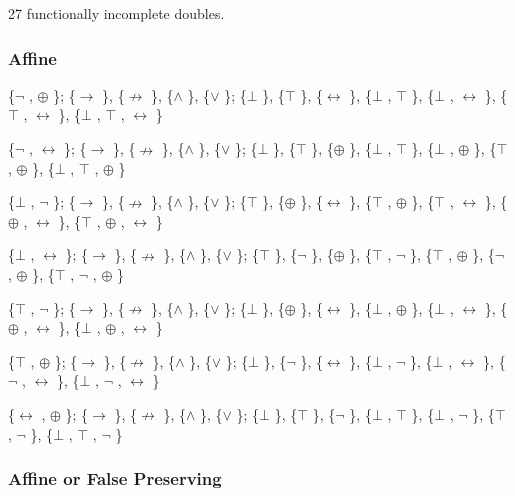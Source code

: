 27 functionally incomplete doubles.

\hypertarget{affine}{%
\subsubsection{Affine}\label{affine}}

\{$\neg$ , $\oplus$ \}; \{$\to$ \}, \{$\nrightarrow$ \}, \{$\land$ \}, \{$\lor$ \}; \{$\bot$ \}, \{$\top$ \}, \{$\leftrightarrow$ \}, \{$\bot$ , $\top$ \},
\{$\bot$ , $\leftrightarrow$ \}, \{$\top$ , $\leftrightarrow$ \}, \{$\bot$ , $\top$ , $\leftrightarrow$ \}

\{$\neg$ , $\leftrightarrow$ \}; \{$\to$ \}, \{$\nrightarrow$ \}, \{$\land$ \}, \{$\lor$ \}; \{$\bot$ \}, \{$\top$ \}, \{$\oplus$ \}, \{$\bot$ , $\top$ \},
\{$\bot$ , $\oplus$ \}, \{$\top$ , $\oplus$ \}, \{$\bot$ , $\top$ , $\oplus$ \}

\{$\bot$ , $\neg$ \}; \{$\to$ \}, \{$\nrightarrow$ \}, \{$\land$ \}, \{$\lor$ \}; \{$\top$ \}, \{$\oplus$ \}, \{$\leftrightarrow$ \}, \{$\top$ , $\oplus$ \},
\{$\top$ , $\leftrightarrow$ \}, \{$\oplus$ , $\leftrightarrow$ \}, \{$\top$ , $\oplus$ , $\leftrightarrow$ \}

\{$\bot$ , $\leftrightarrow$ \}; \{$\to$ \}, \{$\nrightarrow$ \}, \{$\land$ \}, \{$\lor$ \}; \{$\top$ \}, \{$\neg$ \}, \{$\oplus$ \}, \{$\top$ , $\neg$ \},
\{$\top$ , $\oplus$ \}, \{$\neg$ , $\oplus$ \}, \{$\top$ , $\neg$ , $\oplus$ \}

\{$\top$ , $\neg$ \}; \{$\to$ \}, \{$\nrightarrow$ \}, \{$\land$ \}, \{$\lor$ \}; \{$\bot$ \}, \{$\oplus$ \}, \{$\leftrightarrow$ \}, \{$\bot$ , $\oplus$ \},
\{$\bot$ , $\leftrightarrow$ \}, \{$\oplus$ , $\leftrightarrow$ \}, \{$\bot$ , $\oplus$ , $\leftrightarrow$ \}

\{$\top$ , $\oplus$ \}; \{$\to$ \}, \{$\nrightarrow$ \}, \{$\land$ \}, \{$\lor$ \}; \{$\bot$ \}, \{$\neg$ \}, \{$\leftrightarrow$ \}, \{$\bot$ , $\neg$ \},
\{$\bot$ , $\leftrightarrow$ \}, \{$\neg$ , $\leftrightarrow$ \}, \{$\bot$ , $\neg$ , $\leftrightarrow$ \}

\{$\leftrightarrow$ , $\oplus$ \}; \{$\to$ \}, \{$\nrightarrow$ \}, \{$\land$ \}, \{$\lor$ \}; \{$\bot$ \}, \{$\top$ \}, \{$\neg$ \}, \{$\bot$ , $\top$ \},
\{$\bot$ , $\neg$ \}, \{$\top$ , $\neg$ \}, \{$\bot$ , $\top$ , $\neg$ \}

\hypertarget{affine-or-false-preserving}{%
\subsubsection{Affine or False
Preserving}\label{affine-or-false-preserving}}

